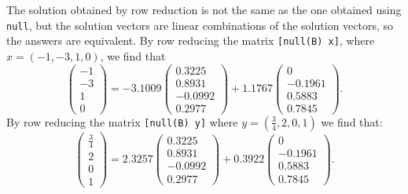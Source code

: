 \documentclass{ximera}
\begin{document}
\begin{exercise}
\begin{solution}
The solution obtained by row reduction is not the same as the one
obtained using {\tt null}, but the solution vectors are linear
combinations of the \Matlab solution vectors, so the answers are
equivalent.  By row reducing the matrix {\tt [null(B) x]}, where
$x = (-1,-3,1,0)$, we find that
\[
\left(\begin{array}{r} -1 \\ -3 \\ 1 \\ 0 \end{array}\right) =
-3.1009\left(\begin{array}{r} 0.3225 \\ 0.8931 \\ -0.0992 \\ 0.2977
\end{array}\right) + 1.1767\left(\begin{array}{r} 0 \\ -0.1961 \\
0.5883 \\ 0.7845 \end{array}\right).
\]
By row reducing the matrix {\tt [null(B) y]} where $y = (\frac{3}{4},
2,0,1)$ we find that:
\[
\left(\begin{array}{r} \frac{3}{4} \\ 2 \\ 0 \\ 1 \end{array}\right) =
2.3257\left(\begin{array}{r} 0.3225 \\ 0.8931 \\ -0.0992 \\ 0.2977
\end{array}\right) + 0.3922\left(\begin{array}{r} 0 \\ -0.1961 \\
0.5883 \\ 0.7845 \end{array}\right).
\]

\end{solution}
\end{exercise}
\end{document}
